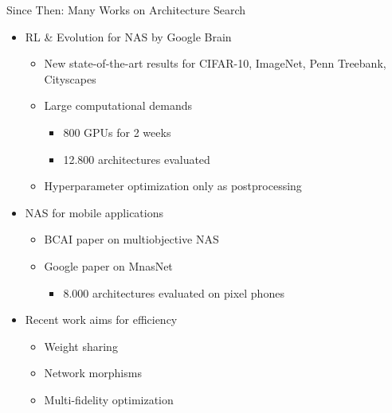 \begin{frame}[c]{Since Then: Many Works on Architecture Search}
	\begin{itemize}
		\item RL \& Evolution for NAS by Google Brain 
		\begin{itemize}
			\item New state-of-the-art results for
			CIFAR-10, ImageNet, Penn Treebank, Cityscapes
			\item Large computational demands
			\begin{itemize}
				\item \alert{800 GPUs for 2 weeks}
				\item \alert{12.800 architectures evaluated}
			\end{itemize}
			\item Hyperparameter optimization only as postprocessing
		\end{itemize}
		\item \alert{NAS for mobile applications}
		\begin{itemize}
			\item BCAI paper on multiobjective NAS 
			\item Google paper on MnasNet 
			\begin{itemize}
				\item 8.000 architectures evaluated on pixel phones
			\end{itemize}
		\end{itemize}
	\item \alert{Recent work aims for efficiency}
		\begin{itemize}
			\item Weight sharing 
			\item Network morphisms 
			\item Multi-fidelity optimization 
		\end{itemize}
	\end{itemize}
\end{frame}
